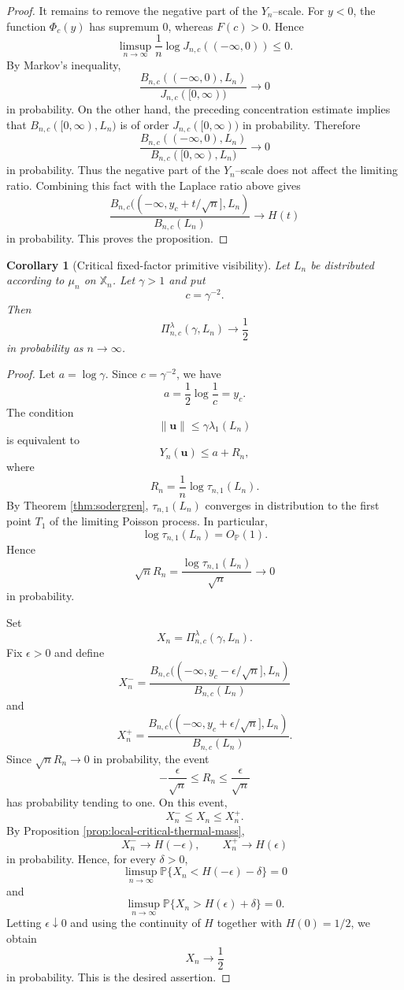 \documentclass[a4paper,12pt]{article}
\newtheorem{cor}[thm]{Corollary}
\theoremstyle{definition}
\theoremstyle{remark}
\newcommand{\pr}{\mathbb P}
\begin{document}
\begin{proof}
It remains to remove the negative part of the $Y_n$--scale. For $y<0$,
the function $\Phi_c(y)$ has supremum $0$, whereas $F(c)>0$. Hence
$$
\limsup_{n\to\infty}
\frac{1}{n}\log J_{n,c}((-\infty,0))\le 0.
$$
By Markov's inequality,
$$
\frac{
B_{n,c}((-\infty,0),L_n)
}{
J_{n,c}([0,\infty))
}
\longrightarrow 0
$$
in probability. On the other hand, the preceding concentration estimate
implies that $B_{n,c}([0,\infty),L_n)$ is of order
$J_{n,c}([0,\infty))$ in probability. Therefore
$$
\frac{
B_{n,c}((-\infty,0),L_n)
}{
B_{n,c}([0,\infty),L_n)
}
\longrightarrow 0
$$
in probability. Thus the negative part of the $Y_n$--scale does not affect
the limiting ratio. Combining this fact with the Laplace ratio above gives
$$
\frac{
B_{n,c}((-\infty,y_c+t/\sqrt{n}],L_n)
}{
B_{n,c}(L_n)
}
\longrightarrow H(t)
$$
in probability. This proves the proposition.
\end{proof}

\begin{cor}[Critical fixed-factor primitive visibility]
\label{cor:critical-fixed-factor-visibility}
Let $L_n$ be distributed according to $\mu_n$ on $\mathbb X_n$.
Let $\gamma>1$ and put
$$
c=\gamma^{-2}.
$$
Then
$$
\Pi_{n,c}^{\lambda}(\gamma,L_n)
\longrightarrow
\frac{1}{2}
$$
in probability as $n\to\infty$.
\end{cor}

\begin{proof}
Let $a=\log\gamma$.
Since $c=\gamma^{-2}$, we have
$$
a=\frac{1}{2}\log\frac{1}{c}=y_c.
$$
The condition
$$
\|\bm u\|\le \gamma\lambda_1(L_n)
$$
is equivalent to
$$
Y_n(\bm u)\le a+R_n,
$$
where
$$
R_n=\frac{1}{n}\log \tau_{n,1}(L_n).
$$
By Theorem \ref{thm:sodergren}, $\tau_{n,1}(L_n)$ converges in distribution
to the first point $T_1$ of the limiting Poisson process. In particular,
$$
\log \tau_{n,1}(L_n)=O_{\mathbb P}(1).
$$
Hence
$$
\sqrt n R_n
=
\frac{\log \tau_{n,1}(L_n)}{\sqrt n}
\longrightarrow 0
$$
in probability.

Set
$$
X_n=\Pi_{n,c}^{\lambda}(\gamma,L_n).
$$
Fix $\epsilon>0$ and define
$$
X_n^-=
\frac{
B_{n,c}((-\infty,y_c-\epsilon/\sqrt n],L_n)
}{
B_{n,c}(L_n)
}
$$
and
$$
X_n^+=
\frac{
B_{n,c}((-\infty,y_c+\epsilon/\sqrt n],L_n)
}{
B_{n,c}(L_n)
}.
$$
Since $\sqrt n R_n\to0$ in probability, the event
$$
-\frac{\epsilon}{\sqrt n}\le R_n\le \frac{\epsilon}{\sqrt n}
$$
has probability tending to one. On this event,
$$
X_n^-\le X_n\le X_n^+.
$$
By Proposition \ref{prop:local-critical-thermal-mass},
$$
X_n^-\longrightarrow H(-\epsilon),
\qquad
X_n^+\longrightarrow H(\epsilon)
$$
in probability. Hence, for every $\delta>0$,
$$
\limsup_{n\to\infty}
\pr\{X_n<H(-\epsilon)-\delta\}=0
$$
and
$$
\limsup_{n\to\infty}
\pr\{X_n>H(\epsilon)+\delta\}=0.
$$
Letting $\epsilon\downarrow0$ and using the continuity of $H$ together
with $H(0)=1/2$, we obtain
$$
X_n\longrightarrow\frac{1}{2}
$$
in probability. This is the desired assertion.
\end{proof}
\end{document}
